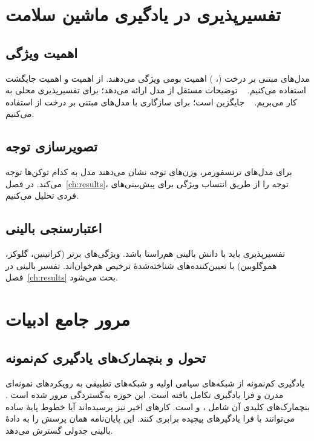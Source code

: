 \section{تفسیرپذیری در یادگیری ماشین سلامت}

\subsection{اهمیت ویژگی}

مدل‌های مبتنی بر درخت (، ) اهمیت بومی ویژگی می‌دهند. از اهمیت  و اهمیت جایگشت استفاده می‌کنیم. ~\cite{lundberg2017unified} توضیحات مستقل از مدل ارائه می‌دهد؛ برای تفسیرپذیری محلی به کار می‌بریم. ~\cite{ribeiro2016should} جایگزین است؛ برای سازگاری با مدل‌های مبتنی بر درخت از  استفاده می‌کنیم.

\subsection{تصویرسازی توجه}

برای مدل‌های ترنسفورمر، وزن‌های توجه نشان می‌دهند مدل به کدام توکن‌ها توجه می‌کند. در فصل~\ref{ch:results}، توجه را از طریق انتساب ویژگی  برای پیش‌بینی‌های فردی تحلیل می‌کنیم.

\subsection{اعتبارسنجی بالینی}

تفسیرپذیری باید با دانش بالینی هم‌راستا باشد. ویژگی‌های برتر (کراتینین، گلوکز، هموگلوبین) با تعیین‌کننده‌های شناخته‌شدۀ ترخیص هم‌خوان‌اند. تفسیر بالینی در فصل~\ref{ch:results} بحث می‌شود.

\section{مرور جامع ادبیات}

\subsection{تحول و بنچمارک‌های یادگیری کم‌نمونه}

یادگیری کم‌نمونه از شبکه‌های سیامی اولیه \cite{koch2015siamese} و شبکه‌های تطبیقی \cite{vinyals2016matching} به رویکردهای نمونه‌ای مدرن \cite{snell2017prototypical} و فرا یادگیری \cite{finn2017model,ravi2017optimization} تکامل یافته است. این حوزه به‌گستردگی مرور شده است \cite{wang2020generalizing}. بنچمارک‌های کلیدی آن شامل  \cite{lake2015human}،  و  \cite{triantafillou2020meta} است. کارهای اخیر نیز پرسیده‌اند آیا خطوط پایۀ ساده \cite{dhillon2019baseline} می‌توانند با فرا یادگیرهای پیچیده برابری کنند. این پایان‌نامه همان پرسش را به دادۀ بالینی جدولی گسترش می‌دهد.

